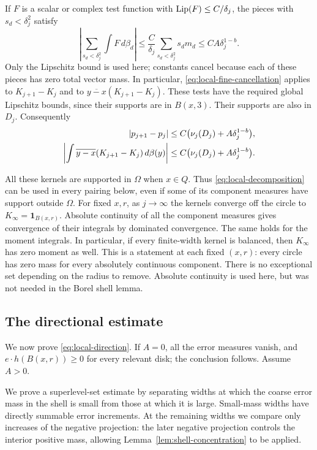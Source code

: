 If $F$ is a scalar or complex test function with
$\operatorname{Lip}(F)\le C/\delta_j$, the pieces with $s_d<\delta_j^2$ satisfy
\begin{equation}\label{eq:local-fine-cancellation}
\left|\sum_{s_d<\delta_j^2}\int F\,d\beta_d\right|
 \le \frac{C}{\delta_j}\sum_{s_d<\delta_j^2}s_dm_d
 \le C A\delta_j^{1-b}.
\end{equation}
Only the Lipschitz bound is used here; constants cancel because each
of these pieces has zero total vector mass. In particular,
\eqref{eq:local-fine-cancellation} applies to $K_{j+1}-K_j$ and to
$\overline{y-x}(K_{j+1}-K_j)$. These tests have the required global
Lipschitz bounds, since their supports are in $B(x,3)$.
Their supports are also in $D_j$. Consequently
\begin{align}
|p_{j+1}-p_j|
&\le C\bigl(\nu_j(D_j)+A\delta_j^{1-b}\bigr),
\notag\\
\left|\int\overline{y-x}(K_{j+1}-K_j)\,d\beta(y)\right|
&\le C\bigl(\nu_j(D_j)+A\delta_j^{1-b}\bigr).
\label{eq:local-increment-tests}
\end{align}

All these kernels are supported in $\Omega$ when $x\in Q$. Thus
\eqref{eq:local-decomposition} can be used in every pairing below,
even if some of its component measures have support outside $\Omega$.
For fixed $x,r$, as $j\to\infty$ the kernels converge off the circle
to $K_\infty=\mathbf1_{B(x,r)}$. Absolute continuity of all the
component measures gives convergence of their integrals by dominated
convergence. The same holds for the moment integrals. In particular, if every
finite-width kernel is balanced, then $K_\infty$ has zero moment as
well. This is a statement at each fixed $(x,r)$: every circle has zero
mass for every absolutely continuous component. There is no exceptional
set depending on the radius to remove. Absolute continuity is used
here, but was not needed in the Borel shell lemma.

\subsection{The directional estimate}

We now prove \eqref{eq:local-direction}. If $A=0$, all the error
measures vanish, and $e\cdot h(B(x,r))\ge0$ for every relevant disk;
the conclusion follows. Assume $A>0$.

We prove a superlevel-set estimate by separating widths at which the
coarse error mass in the shell is small from those at which it is large.
Small-mass widths have directly summable error increments. At the
remaining widths we compare only increases of the negative projection:
the later negative projection controls the interior positive mass,
allowing Lemma~\ref{lem:shell-concentration} to be applied.

